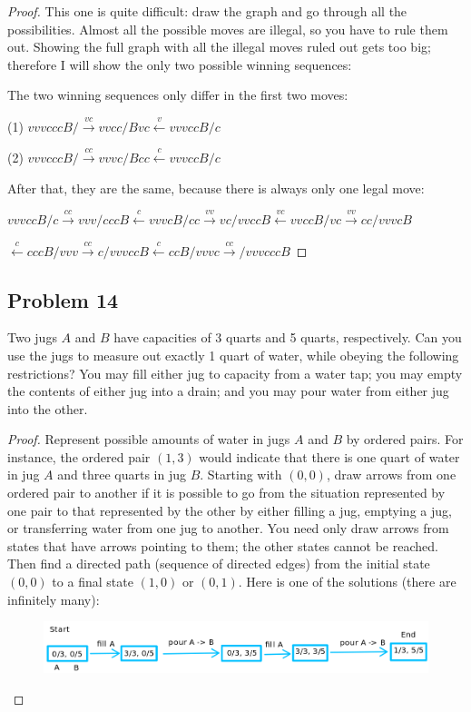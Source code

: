 \documentclass[14pt]{extarticle}
\newcommand{\from}{\leftarrow}
\begin{document}
\begin{proof}
This one is quite difficult: draw the graph and go through all the
possibilities. Almost all the possible moves are illegal, so you have to rule
them out. Showing the full graph with all the illegal moves ruled out gets too
big; therefore I will show the only two possible winning sequences:

The two winning sequences only differ in the first two moves:

(1) $vvvcccB/ \overset{vc}{\to} vvcc/Bvc \overset{v}{\from} vvvccB/c$

(2) $vvvcccB/ \overset{cc}{\to} vvvc/Bcc \overset{c}{\from} vvvccB/c$

After that, they are the same, because there is always only one legal move:

$
vvvccB/c \overset{cc}{\to} vvv/cccB \overset{c}{\from} vvvcB/cc
\overset{vv}{\to} vc/vvccB \overset{vc}{\from} vvccB/vc \overset{vv}{\to}
cc/vvvcB$

$\overset{c}{\from} cccB/vvv \overset{cc}{\to} c/vvvccB
\overset{c}{\from} ccB/vvvc \overset{cc}{\to} /vvvcccB$

\end{proof}

\subsection{Problem 14}
Two jugs $A$ and $B$ have capacities of 3 quarts and 5 quarts, respectively.
Can you use the jugs to measure out exactly 1 quart of water, while obeying the
following restrictions? You may fill either jug to capacity from a water tap;
you may empty the contents of either jug into a drain; and you may pour water
from either jug into the other.

\begin{proof}
Represent possible amounts of water in jugs $A$ and $B$ by ordered
pairs. For instance, the ordered pair $(1, 3)$ would indicate that there
is one quart of water in jug $A$ and three quarts in jug $B$. Starting with
$(0, 0)$, draw arrows from one ordered pair to another if it is possible to go
from the situation represented by one pair to that represented by the other by
either filling a jug, emptying a jug, or transferring water from one jug to
another. You need only draw arrows from states that have arrows pointing to
them; the other states cannot be reached. Then find a directed path (sequence of
directed edges) from the initial state $(0, 0)$ to a final state $(1, 0)$ or
$(0, 1)$. Here is one of the solutions (there are infinitely many):

\begin{figure}[ht!]
\centering
\includegraphics[scale=0.5]{../images/1.4.14.png}
\end{figure}
\end{proof}
\end{document}
